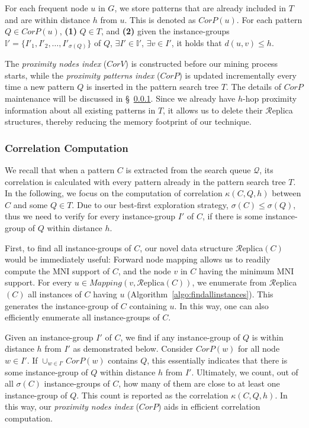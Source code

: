  For each frequent node $u$ in $G$, we store
patterns that are already included in $T$ and are within distance $h$ from
$u$. This is denoted as $CorP(u)$. For each pattern $Q\in CorP(u)$, {\bf (1)}
$Q\in T$, and {\bf (2)} given the instance-groups
$\mathbb{I'}=\{I'_1,I'_2,\ldots,I'_{\sigma(Q)}\}$ of $Q$, $\exists I'\in
\mathbb{I'}$, $\exists v\in I'$, it holds that $d(u,v)\le h$.

The {\em proximity nodes index} ($CorV$) is constructed before our mining
process starts, while the {\em proximity patterns index} ($CorP$) is updated
incrementally every time a new pattern $Q$ is inserted in the pattern search
tree $T$. The details of $CorP$ maintenance will be discussed in
\S~\ref{sec:cor_compute}. Since we already have $h$-hop proximity information
about all existing patterns in $T$, it allows us to delete their $\mathcal{R}$eplica
structures, thereby reducing the memory footprint of our technique.
%
%
\subsubsection{Correlation Computation}
\label{sec:cor_compute}
%
We recall that when a pattern $C$ is extracted from the search queue $\mathcal{Q}$, its
correlation is calculated with every pattern already in the pattern search tree $T$.
In the following, we focus on the computation of correlation $\kappa(C,Q,h)$ between $C$ and some $Q\in T$.
Due to our best-first exploration strategy, $\sigma(C)\le\sigma(Q)$, thus we need to verify
for every instance-group $I'$ of $C$, if there is some instance-group of $Q$ within distance $h$.

First, to find all instance-groups of $C$, our novel data structure $\mathcal{R}$eplica$(C)$ would be
immediately useful: Forward node mapping allows us to readily compute the MNI support of $C$, and the
node $v$ in $C$ having the minimum MNI support. For every $u \in Mapping(v,\mathcal{R}\text{eplica}(C))$,
we enumerate from $\mathcal{R}$eplica$(C)$ all instances of $C$ having $u$ (Algorithm~\ref{algo:findallinstances}).
This generates the instance-group of $C$ containing $u$. In this way, one can also efficiently enumerate all instance-groups
of $C$.

Given an instance-group $I'$ of $C$, we find if any instance-group of $Q$ is  within distance $h$ from $I'$ as demonstrated below.
Consider $CorP(w)$ for all node $w \in I'$. If $\cup_{w \in I'} CorP(w)$ contains $Q$, this essentially indicates that
there is some instance-group of $Q$ within distance $h$ from $I'$.
Ultimately, we count, out of all $\sigma(C)$ instance-groups
of $C$, how many of them are close to at least one instance-group of $Q$.
This count is reported as the correlation $\kappa(C,Q,h)$.
In this way, our {\em proximity nodes index} ($CorP$)
aids in efficient correlation computation.


